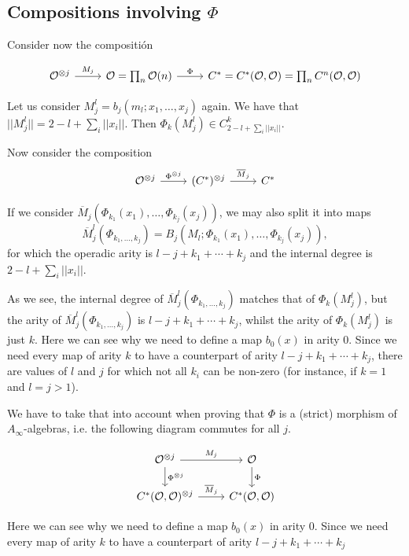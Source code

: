 \documentclass[twoside]{article}
\begin{document}
\subsection{Compositions involving $\Phi$}

Consider now the compositión 

\[
\begin{tikzcd}
\OO^{\otimes j}\arrow[r, "M_j"] & \OO=\prod_n\OO(n)\arrow[r,"\Phi"] &C^*=C^*(\OO,\OO)=\prod_n C^n(\OO,\OO)
\end{tikzcd}
\]

Let us consider $M_j^l=b_j(m_l;x_1,\dots, x_j)$ again. We have that %
$||M_j^l||=2-l+\sum_i ||x_i||$. Then $\Phi_k(M_j^l)\in C^k_{2-l+\sum_i ||x_i||}$.

Now consider the composition
\[
\begin{tikzcd}
\OO^{\otimes j}\arrow[r,"\Phi^{\otimes j}"] &(C^*)^{\otimes j}\arrow[r, "\overline{M}_j"] & C^*
\end{tikzcd}
\]

If we consider $\overline{M}_j(\Phi_{k_1}(x_1),\dots, \Phi_{k_j}(x_j))$, we may also split it into maps $$\overline{M}_j^l(\Phi_{k_1,\dots, k_j})=B_j(M_l;\Phi_{k_1}(x_1),\dots, \Phi_{k_j}(x_j)),$$ for which the operadic arity is $l-j+k_1+\cdots+k_j$ and the internal degree is $2-l+\sum_i||x_i||$. 

As we see, the internal degree of $\overline{M}_j^l(\Phi_{k_1,\dots, k_j})$ matches that of $\Phi_k(M_j^l)$, but the arity of $\overline{M}_j^l(\Phi_{k_1,\dots, k_j})$ is $l-j+k_1+\cdots+k_j$, whilst the arity of $\Phi_k(M_j^l)$ is just $k$. Here we can see why we need to define a map $b_0(x)$ in arity 0. Since we need every map of arity $k$ to have a counterpart of arity $l-j+k_1+\cdots+k_j$, there are values of $l$ and $j$ for which not all $k_i$ can be non-zero (for instance, if $k=1$ and $l=j>1$). 

We have to take that into account when proving that $\Phi$ is a (strict) morphism of $A_\infty$-algebras, i.e. the following diagram commutes for all $j$.

\[
\begin{tikzcd}
\mathcal{O}^{\otimes j} \arrow[r, "M_j"] \arrow[d, "\Phi^{\otimes j}"]             & \mathcal{O} \arrow[d, "\Phi"]  \\
{C^*(\mathcal{O},\mathcal{O})^{\otimes j}} \arrow[r, "\overline{M}_j"] & {C^*(\mathcal{O},\mathcal{O})}
\end{tikzcd}
\]

Here we can see why we need to define a map $b_0(x)$ in arity 0. Since we need every map of arity $k$ to have a counterpart of arity $l-j+k_1+\cdots+k_j$
\end{document}
